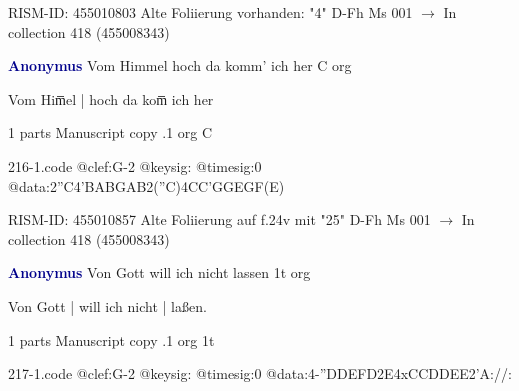 \documentclass[twocolumn]{book}
\begin{document}
\newline RISM-ID: 455010803
\newline Alte Foliierung vorhanden: "4"
\newline D-Fh  Ms 001
\newline $\rightarrow$ In collection 418 (455008343)

\newline \par \vspace{7pt} \textcolor{darkblue}{\textbf{Anonymus  }}
\newline Vom Himmel hoch da komm' ich her  C  
\newline org
\newline \begin{itshape}[f.24v, at left:] Vom Him̅el | hoch da kom̅ ich her\end{itshape} 
\newline \textcolor{darkblue}{}  1 parts  
\newline Manuscript copy
.1  org  C  
\begin{filecontents*}{216-1.code}
@clef:G-2
@keysig:
@timesig:0
@data:2''C4'BABGAB2(''C)4CC'GGEGF(E)
\end{filecontents*}
\newline
%

\newline RISM-ID: 455010857
\newline Alte Foliierung auf f.24v mit "25"
\newline D-Fh  Ms 001
\newline $\rightarrow$ In collection 418 (455008343)

\newline \par \vspace{7pt} \textcolor{darkblue}{\textbf{Anonymus  }}
\newline Von Gott will ich nicht lassen  1t  
\newline org
\newline \begin{itshape}[f.27v, at left:] Von Gott | will ich nicht | laßen.\end{itshape} 
\newline \textcolor{darkblue}{}  1 parts  
\newline Manuscript copy
.1  org  1t  
\begin{filecontents*}{217-1.code}
@clef:G-2
@keysig:
@timesig:0
@data:4-''DDEFD2E4xCCDDEE2'A://:
\end{filecontents*}
\newline
%
\end{document}
